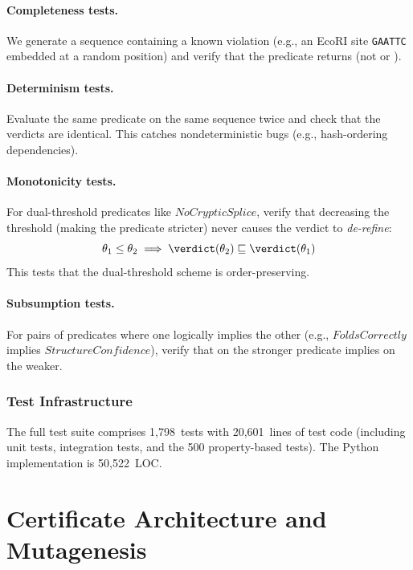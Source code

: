 \paragraph{Completeness tests.}
We generate a sequence containing a known violation (e.g., an EcoRI
site \texttt{GAATTC} embedded at a random position) and verify that
the predicate returns \FAIL{} (not \PASS{} or \UNCERTAIN{}).

\paragraph{Determinism tests.}
Evaluate the same predicate on the same sequence twice and check that
the verdicts are identical.
This catches nondeterministic bugs (e.g., hash-ordering dependencies).

\paragraph{Monotonicity tests.}
For dual-threshold predicates like $\mathit{NoCrypticSplice}$, verify
that decreasing the threshold (making the predicate stricter) never
causes the verdict to \emph{de-refine}:
\[
  \theta_1 \le \theta_2 \;\Longrightarrow\;
  \verdict(\theta_2) \sqsubseteq \verdict(\theta_1)
\]
This tests that the dual-threshold scheme is order-preserving.

\paragraph{Subsumption tests.}
For pairs of predicates where one logically implies the other
(e.g., $\mathit{FoldsCorrectly}$ implies
$\mathit{StructureConfidence}$), verify that \PASS{} on the stronger
predicate implies \PASS{} on the weaker.

\subsubsection{Test Infrastructure}

The full test suite comprises 1{,}798~tests with 20{,}601~lines of
test code (including unit tests, integration tests, and the 500
property-based tests).
The Python implementation is 50{,}522~LOC.

\section{Certificate Architecture and Mutagenesis}\label{sec:cert-mut}

